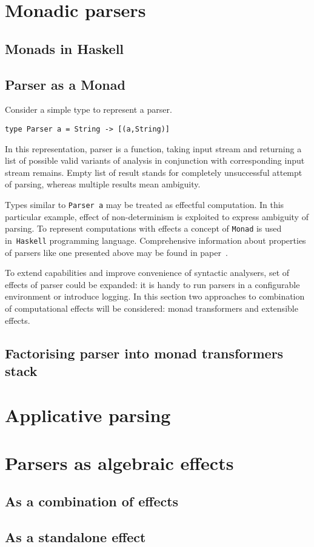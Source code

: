  \section{Monadic parsers}
  \label{cpt-parsers:monadic}

    \subsection{Monads in Haskell}

    \subsection{Parser as a Monad}

      Consider a simple type to represent a parser.

      \begin{lstlisting}
type Parser a = String -> [(a,String)]
      \end{lstlisting}

      In this representation, parser is a
      function, taking input stream and returning a list of possible valid
      variants of analysis in conjunction with corresponding input stream
      remains. Empty list of result stands for completely unsuccessful attempt of
      parsing, whereas multiple results mean ambiguity.

      Types similar to \texttt{Parser a} may be treated as effectful computation.
      In this particular example, effect of non-determinism is exploited to express
      ambiguity of parsing. To represent computations with effects a concept of
      \texttt{Monad} is used in~\texttt{Haskell} programming language.
      Comprehensive information about properties of parsers like one presented
      above may be found in paper~\cite{monParsing}.

      To extend capabilities and improve convenience of syntactic analysers, set of
      effects of parser could be expanded: it is handy to run parsers in a configurable
      environment or introduce logging. In this section two approaches to combination
      of computational effects will be considered: monad transformers and extensible
      effects.

    \subsection{Factorising parser into monad transformers stack}

  \section{Applicative parsing}
  \label{cpt-parsers:applicative}

  \section{Parsers as algebraic effects}
  \label{cpt-parsers:alg-eff}

    \subsection{As a combination of effects}

    \subsection{As a standalone effect}